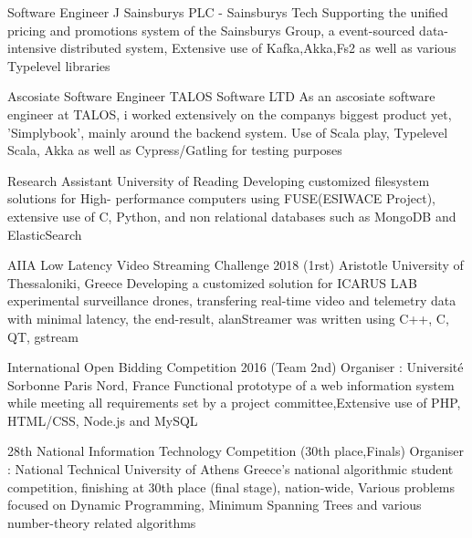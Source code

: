 \documentclass[a4paper]{ReadableCV}
\begin{document}
	{Software Engineer}
	{J Sainsburys PLC - Sainsburys Tech}
	{Supporting the unified pricing and promotions system  of the Sainsburys Group, a event-sourced data-intensive distributed system, Extensive use of Kafka,Akka,Fs2 as well as various Typelevel libraries }
	
	{Ascosiate Software Engineer}
	{TALOS Software LTD}
	{As an ascosiate software engineer at TALOS, i worked extensively on the companys biggest product yet, 'Simplybook', mainly around the 
	backend system. Use of Scala play, Typelevel Scala, Akka as well as Cypress/Gatling for testing purposes }
	
	
	{Research Assistant}
	{University of Reading}
	{Developing customized filesystem solutions for High- performance computers using FUSE(ESIWACE Project), extensive use of C, Python, and non relational databases such as MongoDB and ElasticSearch}
	
	\newpage
	
	
	{AIIA Low Latency Video Streaming Challenge 2018 (1rst)}
	{Aristotle University of Thessaloniki, Greece}
	{Developing a customized solution for ICARUS LAB experimental surveillance drones, transfering real-time video and telemetry data with minimal latency, the end-result, alanStreamer was written using C++, C, QT, gstream}
	
	{International Open Bidding Competition 2016 (Team 2nd)}
	{Organiser : Université Sorbonne Paris Nord, France}
	{Functional prototype of a web information system while meeting all requirements set by a project committee,Extensive use of PHP, HTML/CSS,  Node.js and MySQL}
	
	{28th National Information Technology Competition (30th place,Finals)}
	{Organiser : National Technical University of Athens}
	{Greece's national algorithmic student competition, finishing at 30th place (final stage), nation-wide, Various problems
	focused on Dynamic Programming, Minimum Spanning Trees and various number-theory related algorithms}
	
	

	
	
\end{document}
